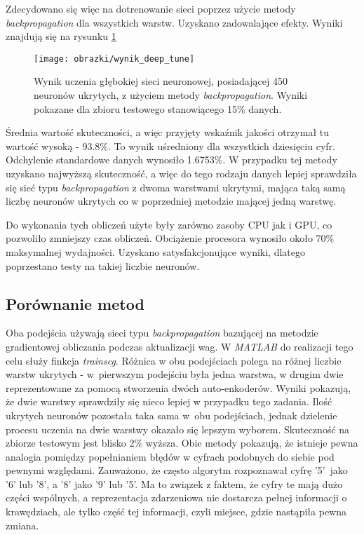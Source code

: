 \noindent Zdecydowano się więc na dotrenowanie sieci poprzez użycie metody \textit{backpropagation} dla wszystkich warstw. Uzyskano zadowalające efekty. Wyniki znajdują się na rysunku \ref{fig:wynik3}

\begin{center}
\begin{figure}[H]
	\centering
	\texttt{[image: obrazki/wynik\_deep\_tune]}
	\caption{\label{fig:subcaption_example}Wynik uczenia głębokiej sieci neuronowej, posiadającej 450 neuronów ukrytych, z użyciem metody \textit{backpropagation}. Wyniki pokazane dla zbioru testowego stanowiącego 15\% danych.}{\label{fig:wynik3}}
\end{figure}
\end{center}


\noindent Średnia wartość skuteczności, a więc przyjęty wskaźnik jakości otrzymał tu wartość wysoką - 93.8\%. To wynik uśredniony dla wszystkich dziesięciu cyfr. Odchylenie standardowe danych wynosiło 1.6753\%. W przypadku tej metody uzyskano najwyższą skuteczność, a więc do tego rodzaju danych lepiej sprawdziła się sieć typu \textit{backpropagation} z dwoma warstwami ukrytymi, mająca taką samą liczbę neuronów ukrytych co w poprzedniej metodzie mającej jedną warstwę. 

Do wykonania tych obliczeń użyte były zarówno zasoby CPU jak i GPU, co pozwoliło zmniejszy czas obliczeń. Obciążenie procesora wynosiło około 70\% maksymalnej wydajności. Uzyskano satysfakcjonujące wyniki, dlatego poprzestano testy na takiej liczbie neuronów.

\subsection{Porównanie metod}
\label{sub:porownanie}

Oba podejścia używają sieci typu \textit{backpropagation} bazującej na metodzie gradientowej obliczania podczas aktualizacji wag. W \textit{MATLAB} do realizacji tego celu służy finkcja \textit{trainscg}. Różnica w obu podejściach polega na różnej liczbie warstw ukrytych - w~pierwszym podejściu była jedna warstwa, w drugim dwie reprezentowane za pomocą stworzenia dwóch auto-enkoderów. Wyniki pokazują, że dwie warstwy sprawdziły się nieco lepiej w przypadku tego zadania. Ilość ukrytych neuronów pozostała taka sama w~obu podejściach, jednak dzielenie procesu uczenia na dwie warstwy okazało się lepszym wyborem. Skuteczność na zbiorze testowym jest blisko 2\% wyższa.
Obie metody pokazują, że istnieje pewna analogia pomiędzy popełnianiem błędów w cyfrach podobnych do siebie pod pewnymi względami. Zauważono, że często algorytm rozpoznawał cyfrę '5'~jako '6' lub '8', a '8' jako '9' lub '5'. Ma to związek z faktem, że cyfry te mają dużo części wspólnych, a reprezentacja zdarzeniowa nie dostarcza pełnej informacji o krawędziach, ale tylko część tej informacji, czyli miejsce, gdzie nastąpiła pewna zmiana. 
